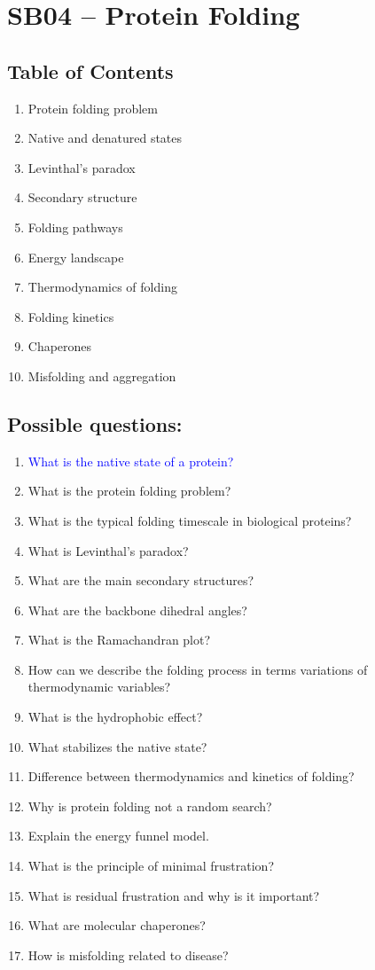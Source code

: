 \section{SB04 -- Protein Folding \done}

\subsection*{Table of Contents}
\begin{enumerate}
\item Protein folding problem
\item Native and denatured states
\item Levinthal's paradox
\item Secondary structure
\item Folding pathways
\item Energy landscape
\item Thermodynamics of folding
\item Folding kinetics
\item Chaperones
\item Misfolding and aggregation
\end{enumerate}

\subsection*{Possible questions:}
\begin{enumerate}
\item{\textcolor{blue}{What is the native state of a protein?}}
\item{What is the protein folding problem?}
\item{What is the typical folding timescale in biological proteins?}
\item{What is Levinthal's paradox?}
\item{What are the main secondary structures?}
\item {What are the backbone dihedral angles?}
\item {What is the Ramachandran plot?}
\item {How can we describe the folding process in terms variations of thermodynamic variables?}
\item{What is the hydrophobic effect?}
\item{What stabilizes the native state?}
\item{Difference between thermodynamics and kinetics of folding?}
\item{Why is protein folding not a random search?}
\item{Explain the energy funnel model.}
\item {What is the principle of minimal frustration?}
\item {What is residual frustration and why is it important?}
\item{What are molecular chaperones?}
\item{How is misfolding related to disease?}
\end{enumerate}

